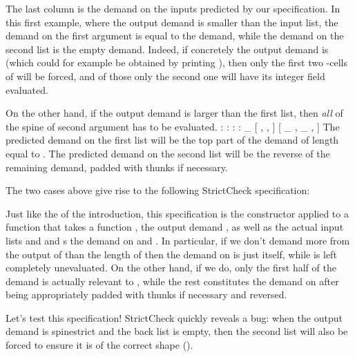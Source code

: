 \documentclass[acmsmall,review]{acmart}\settopmatter{}
\begin{document}
The last column is the demand on the inputs predicted by our
specification.  In this first example, where the output demand is
smaller than the input list, the demand on the first argument 
is equal to the demand, while the demand on the second list  is
the empty demand. Indeed, if concretely the output demand is  (which could for example be obtained by printing ), then only the first
two -cells of  will be forced, and of those only the
second one will have its integer field evaluated.

On the other hand, if the output demand is larger than the first list,
then \textit{all} of the spine of second argument has to be evaluated.
%
\rotex{[1,2,3]}{[6,5,4]}{[1,2,3,4,5,6]}
      { :  :  :  : \_}{ [  ,  ,  ] } { [ \_ , \_ ,  ] }
%
The predicted demand on the first list will be the top part of the
demand of length equal to . The predicted demand on the
second list will be the reverse of the remaining demand, padded with
thunks if necessary.

The two cases above give rise to the following StrictCheck specification:
%
%
Just like the  of the introduction, this specification
is the constructor  applied to a function that takes a
function , the output demand , as well as the actual
input lists  and  and s the demand
on  and . In particular, if we don't demand more from
the output of  than the length of  then the
demand on  is just  itself, while  is left
completely unevaluated. On the other hand, if we do, only the first
half of the demand is actually relevant to , while the rest
constitutes the demand on  after being appropriately padded
with thunks if necessary and reversed.

Let's test this specification!
%
%
StrictCheck quickly reveals a bug: when the output demand is
spinestrict and the back list  is empty, then the second list
will also be forced to ensure it is of the correct shape
(\lk{[]}). 
\end{document}
